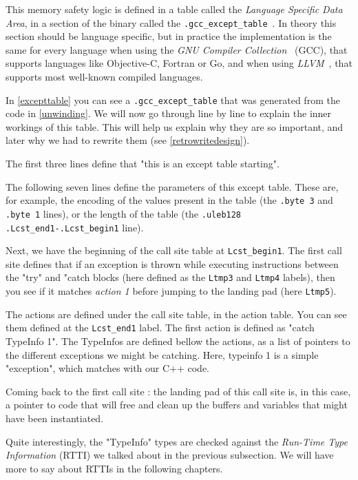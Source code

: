 \documentclass[a4paper,11pt,oneside]{report}
\begin{document}
This memory safety logic is defined in a table called the \emph{Language
Specific Data Area}, in a section of the binary called the
\texttt{.gcc\_except\_table}~\cite{airsexcepttable}.
In theory this section should be language specific, but in practice the
implementation is the same for every language when using the \emph{GNU
Compiler Collection}~\cite{gcc} (GCC), that supports languages like
Objective-C, Fortran or Go, and when using \emph{LLVM}~\cite{llvm}, that
supports most well-known compiled languages.

In \autoref{excepttable} you can see a \texttt{.gcc\_except\_table} that 
was generated from the code in \autoref{unwinding}. We will now go through line
by line to explain the inner workings of this table.
This will help us explain why they are so important, and later why we had to
rewrite them (see \autoref{retrowritedesign}).

The first three lines define that "this is an except table starting".

The following seven lines define the parameters of this except table.
These are, for example, the encoding of the values present in the table (the
\texttt{.byte 3} and \texttt{.byte 1} lines), or the length of the table (the
\texttt{.uleb128 .Lcst\_end1-.Lcst\_begin1} line).

Next, we have the beginning of the call site table at \texttt{Lcst\_begin1}.
The first call site defines that if an exception is thrown while executing
instructions between the "try" and "catch blocks (here defined as the
\texttt{Ltmp3} and \texttt{Ltmp4} labels), then you see if it matches
\emph{action 1} before jumping to the landing pad (here \texttt{Ltmp5}).

The actions are defined under the call site table, in the action table. You
can see them defined at the \texttt{Lcst\_end1} label.
The first action is defined as "catch TypeInfo 1". The TypeInfos are defined
bellow the actions, as a list of pointers to the different exceptions we might
be catching. Here, typeinfo 1 is a simple "exception", which matches with our
C++ code.

Coming back to the first call site : the landing pad of this call site is, in
this case, a pointer to code that will free and clean up the buffers and
variables that might have been instantiated.

Quite interestingly, the "TypeInfo" types are checked against the
\emph{Run-Time Type Information} (RTTI) we talked about in the previous
subsection.
We will have more to say about RTTIs in the following chapters.
\end{document}
